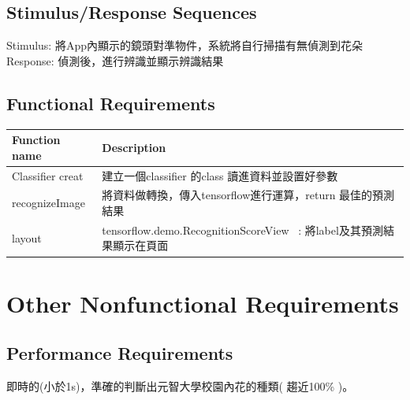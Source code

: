 \documentclass{scrreprt}
\begin{document}
\section{Stimulus/Response Sequences}
\begin{CJK}{UTF8}{bkai}
		Stimulus: 	將App內顯示的鏡頭對準物件，系統將自行掃描有無偵測到花朵 \\
		Response:  偵測後，進行辨識並顯示辨識結果
\end{CJK}

\section{Functional Requirements}
\begin{center}
	\begin{CJK}{UTF8}{bkai}
		
		\begin{tabular}{| l | l |}
		\hline
			\rowcolor{gray}Function name & Description \\ \hline
			Classifier creat &  建立一個classifier 的class 讀進資料並設置好參數 \\ \hline
			recognizeImage & 將資料做轉換，傳入tensorflow進行運算，return 最佳的預測結果 \\ \hline
			layout & tensorflow.demo.RecognitionScoreView \ : 將label及其預測結果顯示在頁面 \\ \hline
		\end{tabular}
	\end{CJK}
\end{center}


\chapter{Other Nonfunctional Requirements}

\section{Performance Requirements}
\begin{CJK}{UTF8}{bkai}
	即時的(小於1s)，準確的判斷出元智大學校園內花的種類( 趨近100\% )。
\end{CJK}
\end{document}

